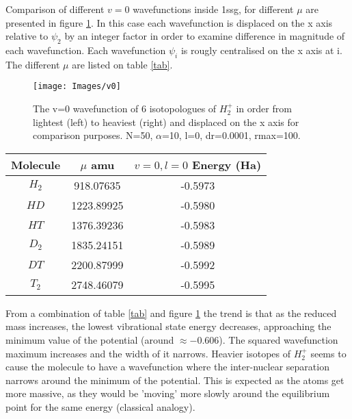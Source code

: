 \documentclass{article}
\begin{document}
Comparison of different $v=0$ wavefunctions inside 1ssg, for different $\mu$ are presented in figure \ref{v0}. In this case each wavefunction is displaced on the x axis relative to $\psi_2$ by an integer factor in order to examine difference in magnitude of each wavefunction. Each wavefunction $\psi_i$ is rougly centralised on the x axis at i. The different $\mu$ are listed on table \ref{tab}.

\begin{figure}[H]
	\centering
	\texttt{[image: Images/v0]}
	\caption{The v=0 wavefunction of 6 isotopologues of $H_2^+$ in order from lightest (left) to heaviest (right) and displaced on the x axis for comparison purposes. N=50, $\alpha$=10, l=0, dr=0.0001, rmax=100.}
	\label{v0}
\end{figure}
	
\begin{center}
	\label{tab}
	\begin{tabular}{ccc}\toprule
	Molecule	&  $\mu$ amu &$v=0, l=0$ Energy (Ha) \\\bottomrule
	$H_2$	& 918.07635 & -0.5973\\
	$HD$	& 1223.89925&-0.5980\\
	$HT$	& 1376.39236&-0.5983\\
	$D_2$	& 1835.24151&-0.5989\\
	$DT$	& 2200.87999&-0.5992\\
	$T_2$	& 2748.46079&-0.5995\\\bottomrule
	\end{tabular}
\end{center}

From a combination of table \ref{tab} and figure \ref{v0} the trend is that as the reduced mass increases, the lowest vibrational state energy decreases, approaching the minimum value of the potential (around $\approx -0.606$). The squared wavefunction maximum increases and the width of it narrows. Heavier isotopes of $H_2^+$ seems to cause the molecule to have a wavefunction where the inter-nuclear separation narrows around the minimum of the potential. This is expected as the atoms get more massive, as they would be 'moving' more slowly around the equilibrium point for the same energy (classical analogy). 

	
\end{document}
